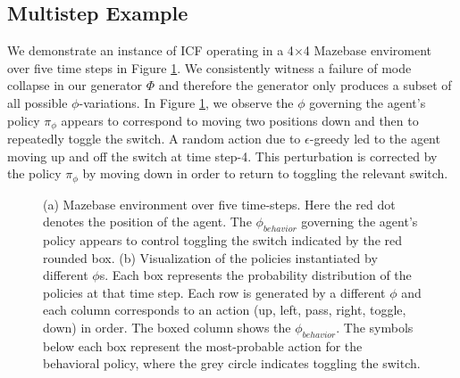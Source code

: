 \subsection{Multistep Example}
\label{sec:multistep}
We demonstrate an instance of ICF operating in a 4$\times$4 Mazebase enviroment over five time steps in Figure \ref{fig:multistep_toggle}. We consistently witness a failure of mode collapse in our generator $\Phi$ and therefore the generator only produces a subset of all possible $\phi$-variations.  In Figure \ref{fig:multistep_toggle}, we observe the $\phi$ governing the agent's policy $\pi_{\phi}$ appears to correspond to moving two positions down and then to repeatedly toggle the switch.  A random action due to $\epsilon$-greedy led to the agent moving up and off the switch at time step-4. This perturbation is corrected by the policy $\pi_{\phi}$ by moving down in order to return to toggling the relevant switch.

\begin{figure}[H]
\centering
{}
\newline
{} 
\caption{(a) Mazebase environment over five time-steps.  Here the red dot denotes the position of the agent.  The $\phi_{behavior}$ governing the agent's policy appears to control toggling the switch indicated by the red rounded box. 
(b) Visualization of the policies instantiated by different $\phi$s.  Each box represents the probability distribution of the policies at that time step.  Each row is generated by a different $\phi$ and each column corresponds to an action (up, left, pass, right, toggle, down) in order.  The boxed column shows the $\phi_{behavior}$. The symbols below each box represent the most-probable action for the behavioral policy, where the grey circle indicates toggling the switch.}
\label{fig:multistep_toggle}
\end{figure}



